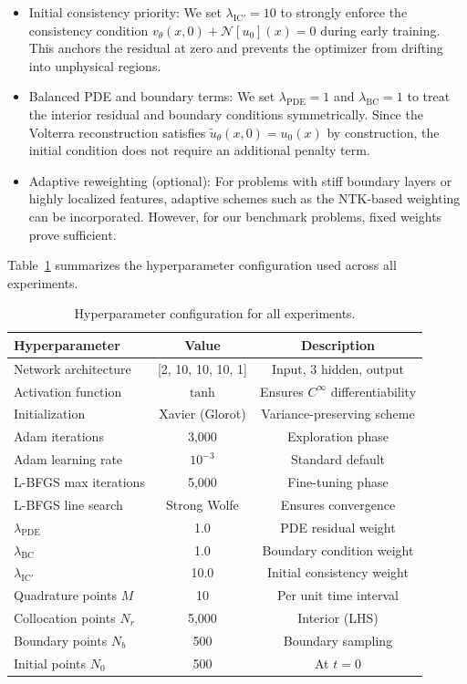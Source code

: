 \documentclass[11pt,reqno]{amsart}
\theoremstyle{plain}
\theoremstyle{definition}
\theoremstyle{remark}
\begin{document}
\begin{itemize}
    \item {Initial consistency priority:} 
    We set $\lambda_{\text{IC}'} = 10$ to strongly enforce the consistency condition $v_\theta(x,0) + \mathcal{N}[u_0](x) = 0$ during early training. 
    This anchors the residual at zero and prevents the optimizer from drifting into unphysical regions.
    
    \item {Balanced PDE and boundary terms:} 
    We set $\lambda_{\text{PDE}} = 1$ and $\lambda_{\text{BC}} = 1$ to treat the 
    interior residual and boundary conditions symmetrically. 
    Since the Volterra reconstruction satisfies $\tilde{u}_\theta(x,0) = u_0(x)$ 
    by construction, the initial condition does not require an additional penalty term.
    
    \item {Adaptive reweighting (optional):} 
    For problems with stiff boundary layers or highly localized features, 
    adaptive schemes such as the NTK-based weighting~\cite{wang2021understanding} 
    can be incorporated. However, for our benchmark problems, fixed weights prove sufficient.
\end{itemize}

Table~\ref{tab:hyperparameters} summarizes the hyperparameter configuration used 
across all experiments.

\begin{table}[htbp]
\centering
\caption{Hyperparameter configuration for all experiments.}
\label{tab:hyperparameters}
\begin{tabular}{lcc}
\toprule
\textbf{Hyperparameter} & \textbf{Value} & \textbf{Description} \\
\midrule
Network architecture & [2, 10, 10, 10, 1] & Input, 3 hidden, output \\
Activation function & $\tanh$ & Ensures $C^\infty$ differentiability \\
Initialization & Xavier (Glorot) & Variance-preserving scheme \\
\midrule
Adam iterations & 3,000 & Exploration phase \\
Adam learning rate & $10^{-3}$ & Standard default \\
L-BFGS max iterations & 5,000 & Fine-tuning phase \\
L-BFGS line search & Strong Wolfe & Ensures convergence \\
\midrule
$\lambda_{\text{PDE}}$ & 1.0 & PDE residual weight \\
$\lambda_{\text{BC}}$ & 1.0 & Boundary condition weight \\
$\lambda_{\text{IC}'}$ & 10.0 & Initial consistency weight \\
\midrule
Quadrature points $M$ & 10 & Per unit time interval \\
Collocation points $N_r$ & 5,000 & Interior (LHS) \\
Boundary points $N_b$ & 500 & Boundary sampling \\
Initial points $N_0$ & 500 & At $t=0$ \\
\bottomrule
\end{tabular}
\end{table}
\end{document}
